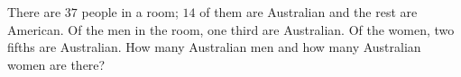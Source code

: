 There are $37$ people in a room; $14$ of them are Australian and the rest are American. Of the men in the room, one third are Australian. Of the women, two fifths are Australian. How many Australian men and how many Australian women are there?
